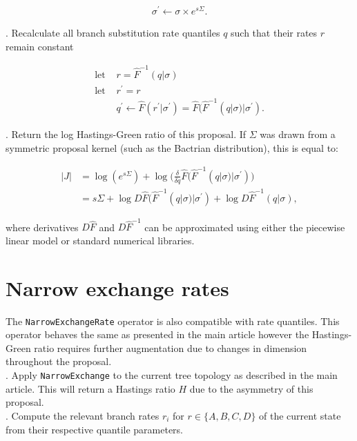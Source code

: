 \documentclass[12pt]{article}
\begin{document}
\begin{align}
	\sigma^\prime \leftarrow \sigma \times e^{s\Sigma}.
\end{align}


. Recalculate all branch substitution rate quantiles $q$ such that their rates $r$ remain constant


\begin{align}
	\text{let } & r = \hat{F}^{-1}(q|\sigma) \\ 
	\text{let } & r^\prime = r\\ 
	& q^\prime \leftarrow \hat{F}( r^\prime|\sigma^\prime) = \hat{F}( \hat{F}^{-1}(q|\sigma)|\sigma^\prime).
\end{align}


. Return the log Hastings-Green ratio of this proposal. 
If $\Sigma$ was drawn from a symmetric proposal kernel (such as the Bactrian distribution), this is equal to:

\begin{align}
	|J| &= \log(e^{s\Sigma}) + \log\Big( \frac{\delta }{\delta q} \hat{F}( \hat{F}^{-1}(q|\sigma)|\sigma^\prime) \Big) \\
	&= s\Sigma + \log D\hat{F}( \hat{F}^{-1}(q|\sigma)|\sigma^\prime) + \log D\hat{F}^{-1}(q|\sigma),
\end{align}

where derivatives $D\hat{F}$ and $D\hat{F}^{-1}$ can be approximated using either the piecewise linear model or standard numerical libraries. 

\clearpage
\section{Narrow exchange rates}


The \texttt{NarrowExchangeRate} operator is also compatible with rate quantiles.
This operator behaves the same as presented in the main article however the Hastings-Green ratio requires further augmentation due to changes in dimension throughout the proposal. \\


. Apply \texttt{NarrowExchange} to the current tree topology as described in the main article. 
This will return a Hastings ratio $H$ due to the asymmetry of this proposal.  \\


. Compute the relevant branch rates $r_i$ for $r \in \{A,B,C,D \}$ of the current state from their respective quantile parameters.  \\
\end{document}
